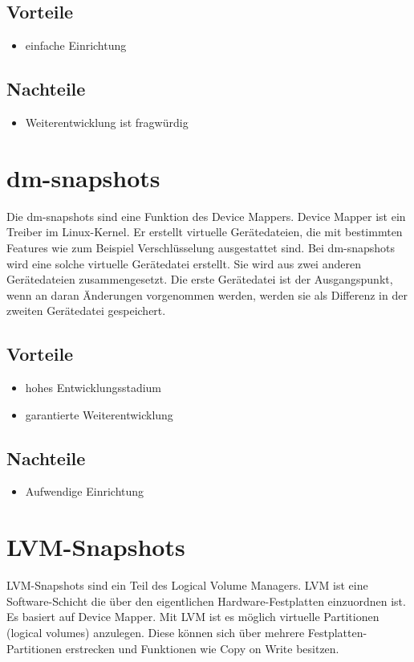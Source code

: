 \subsection{Vorteile}
\begin{itemize}
 \item einfache Einrichtung
\end{itemize}

\subsection{Nachteile}
\begin{itemize}
 \item Weiterentwicklung ist fragwürdig
\end{itemize}

\section{dm-snapshots}
Die dm-snapshots sind eine Funktion des Device Mappers. Device Mapper ist ein Treiber im Linux-Kernel. Er erstellt virtuelle Gerätedateien, die mit bestimmten Features wie zum Beispiel Verschlüsselung ausgestattet sind. Bei dm-snapshots wird eine solche virtuelle Gerätedatei erstellt. Sie wird aus zwei anderen Gerätedateien zusammengesetzt. Die erste Gerätedatei ist der Ausgangspunkt, wenn an daran Änderungen vorgenommen werden, werden sie als Differenz in der zweiten Gerätedatei gespeichert. \cite{dmmbroz} \cite{dmkerneldoc}

\subsection{Vorteile}
\begin{itemize}
 \item hohes Entwicklungsstadium
 \item garantierte Weiterentwicklung
\end{itemize}

\subsection{Nachteile}
\begin{itemize}
 \item Aufwendige Einrichtung
\end{itemize}

\section{LVM-Snapshots}
LVM-Snapshots sind ein Teil des Logical Volume Managers. LVM ist eine Software-Schicht die über den eigentlichen Hardware-Festplatten einzuordnen ist. Es basiert auf Device Mapper. Mit LVM ist es möglich virtuelle Partitionen (logical volumes) anzulegen. Diese können sich über mehrere Festplatten-Partitionen erstrecken und Funktionen wie Copy on Write besitzen. \cite{lvmhowto} \cite{lvmselflinux} \cite{lvmsource}

